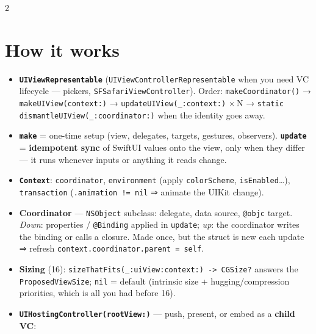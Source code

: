 \documentclass[8pt]{extarticle}
\begin{document}


\begin{multicols}{2}
\raggedright

\section{How it works}
\begin{itemize}
  \item \textbf{\texttt{UIViewRepresentable}} (\texttt{UIViewControllerRepresentable} when you need VC
        lifecycle — pickers, \texttt{SFSafariViewController}). Order: \texttt{makeCoordinator()} →
        \texttt{makeUIView(context:)} → \texttt{updateUIView(\_:context:)} ×\,N →
        \texttt{static dismantleUIView(\_:coordinator:)} when the identity goes away.
  \item \textbf{\texttt{make}} = one-time setup (view, delegates, targets, gestures, observers).
        \textbf{\texttt{update}} = \textbf{idempotent sync} of SwiftUI values onto the view, only when they
        differ — it runs whenever inputs or anything it reads change.
  \item \textbf{\texttt{Context}}: \texttt{coordinator}, \texttt{environment} (apply \texttt{colorScheme},
        \texttt{isEnabled}\ldots), \texttt{transaction} (\texttt{.animation != nil} ⇒ animate the UIKit change).
  \item \textbf{Coordinator} — \texttt{NSObject} subclass: delegate, data source, \texttt{@objc} target.
        \emph{Down}: properties / \texttt{@Binding} applied in \texttt{update}; \emph{up}: the coordinator
        writes the binding or calls a closure. Made once, but the struct is new each update ⇒ refresh
        \texttt{context.coordinator.parent = self}.
  \item \textbf{Sizing} (16): \texttt{sizeThatFits(\_:uiView:context:) -> CGSize?} answers the
        \texttt{ProposedViewSize}; \texttt{nil} = default (intrinsic size + hugging/compression
        priorities, which is all you had before 16).
  \item \textbf{\texttt{UIHostingController(rootView:)}} — push, present, or embed as a \textbf{child VC}:

\end{itemize}
\end{multicols}
\end{document}
